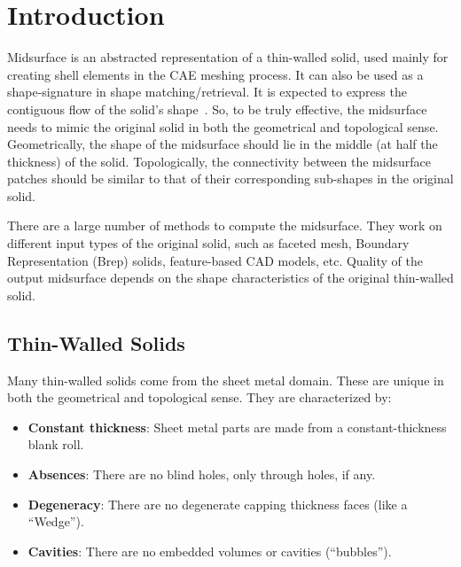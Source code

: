 \documentclass[11pt,a4paper]{article}
\begin{document}
\tableofcontents   %

\section{Introduction}


Midsurface is an abstracted representation of a thin-walled solid, used
mainly for creating shell elements in the CAE meshing process. It can also
be used as a shape-signature in shape matching/retrieval. It is expected to
express the contiguous flow of the solid's shape~\cite{Rezayat1996}. So, to
be truly effective, the midsurface needs to mimic the original solid in both
the geometrical and topological sense. Geometrically, the shape of the
midsurface should lie in the middle (at half the thickness) of the solid.
Topologically, the connectivity between the midsurface patches should be
similar to that of their corresponding sub-shapes in the original solid.

There are a large number of methods to compute the midsurface. They work on
different input types of the original solid, such as faceted mesh, Boundary
Representation (Brep) solids, feature-based CAD models, etc. Quality of the
output midsurface depends on the shape characteristics of the original
thin-walled solid.


\subsection{Thin-Walled Solids}

Many thin-walled solids come from the sheet metal domain. These are unique
in both the geometrical and topological sense. They are characterized by:

\begin{itemize}[noitemsep,topsep=2pt,parsep=2pt,partopsep=2pt,leftmargin=*]
\item \textbf{Constant thickness}: Sheet metal parts are made from a
      constant-thickness blank roll.
\item \textbf{Absences}: There are no blind holes, only through holes, if any.
\item \textbf{Degeneracy}: There are no degenerate capping thickness faces
      (like a ``Wedge'').
\item \textbf{Cavities}: There are no embedded volumes or cavities (``bubbles'').
\end{itemize}
\end{document}
